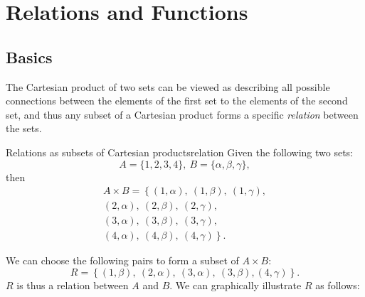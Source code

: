 \section{Relations and Functions}\label{sec:relations_and_functions}
\subsection{Basics}
The Cartesian product of two sets can be viewed as describing all possible connections between the elements of the first set to the elements of the second set, and thus any subset of a Cartesian product forms a specific \emph{relation} between the sets.

\begin{example}{Relations as subsets of Cartesian products}{relation}
	Given the following two sets:
	\[
		A=\{1,2,3,4\},\ B=\{\alpha,\beta,\gamma\},
	\]
	then
	\begin{align*}
		A\times B = \left\{ (1,\alpha),\ (1,\beta),\ (1,\gamma), \right.\\
												(2,\alpha),\ (2,\beta),\ (2,\gamma),\\
												(3,\alpha),\ (3,\beta),\ (3,\gamma),\\
							  \left.	(4,\alpha),\ (4,\beta),\ (4,\gamma) \right\}.
	\end{align*}

	We can choose the following pairs to form a subset of $A\times B$:
	\[
		R = \left\{ (1,\beta),\ (2,\alpha),\ (3,\alpha),\ (3,\beta), (4,\gamma)  \right\}.
	\]
	$R$ is thus a relation between $A$ and $B$. We can graphically illustrate $R$ as follows:
	\begin{figure}[H]
		\centering
	\end{figure}
\end{example}

